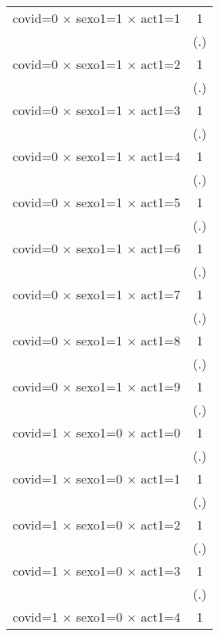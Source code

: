 {\begin{tabular}{l*{1}{c}}
covid=0 $\times$ sexo1=1 $\times$ act1=1&           1         \\
                    &         (.)         \\
[1em]
covid=0 $\times$ sexo1=1 $\times$ act1=2&           1         \\
                    &         (.)         \\
[1em]
covid=0 $\times$ sexo1=1 $\times$ act1=3&           1         \\
                    &         (.)         \\
[1em]
covid=0 $\times$ sexo1=1 $\times$ act1=4&           1         \\
                    &         (.)         \\
[1em]
covid=0 $\times$ sexo1=1 $\times$ act1=5&           1         \\
                    &         (.)         \\
[1em]
covid=0 $\times$ sexo1=1 $\times$ act1=6&           1         \\
                    &         (.)         \\
[1em]
covid=0 $\times$ sexo1=1 $\times$ act1=7&           1         \\
                    &         (.)         \\
[1em]
covid=0 $\times$ sexo1=1 $\times$ act1=8&           1         \\
                    &         (.)         \\
[1em]
covid=0 $\times$ sexo1=1 $\times$ act1=9&           1         \\
                    &         (.)         \\
[1em]
covid=1 $\times$ sexo1=0 $\times$ act1=0&           1         \\
                    &         (.)         \\
[1em]
covid=1 $\times$ sexo1=0 $\times$ act1=1&           1         \\
                    &         (.)         \\
[1em]
covid=1 $\times$ sexo1=0 $\times$ act1=2&           1         \\
                    &         (.)         \\
[1em]
covid=1 $\times$ sexo1=0 $\times$ act1=3&           1         \\
                    &         (.)         \\
[1em]
covid=1 $\times$ sexo1=0 $\times$ act1=4&           1         \\

\end{tabular}}
